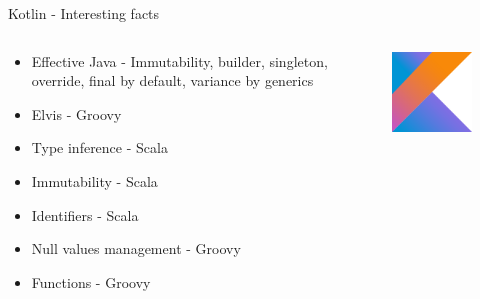 \documentclass[aspectratio=169]{beamer}
\begin{document}
\begin{frame}{Kotlin - Interesting facts}
\begin{columns}
\begin{column}{0.5\textwidth}
	\begin{itemize}
		\item Effective Java - Immutability, builder, singleton, override, final by default, variance by generics
		\item Elvis - Groovy 
		\item Type inference - Scala
		\item Immutability - Scala
		\item Identifiers - Scala
		\item Null values management - Groovy
		\item Functions - Groovy
	\end{itemize}
\end{column}
\begin{column}{0.5\textwidth}  %
	\begin{figure}
		\centering
		\includegraphics[width=0.7\linewidth]{Images/kotlin}
	\end{figure}
\end{column}
\end{columns}
\end{frame}
\end{document}
